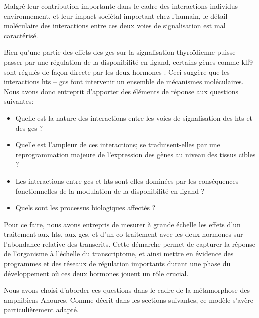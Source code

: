 \documentclass[../main.tex]{subfiles}
\begin{document}
\par
Malgré leur contribution importante dans le cadre des interactions individus-environnement, et leur impact sociétal important chez l'humain, le détail moléculaire des interactions entre ces deux voies de signalisation est mal caractérisé.
\par
Bien qu'une partie des effets des \glspl{gc} sur la signalisation thyroïdienne puisse passer par une régulation de la disponibilité en ligand, certains gènes comme \gls{klf9} sont régulés de façon directe par les deux hormones \citep{Denver2009b,Bagamasbad2012}.
Ceci suggère que les interactions \glspl{ht} – \glspl{gc} font intervenir un ensemble de mécanismes moléculaires. 
Nous avons donc entreprit d'apporter des éléments de réponse aux questions suivantes:
\begin{itemize}
\item Quelle est la nature des interactions entre les voies de signalisation des \glspl{ht} et des \glspl{gc} ? 
\item Quelle est l'ampleur de ces interactions; se traduisent-elles par une reprogrammation majeure de l'expression des gènes au niveau des tissus cibles ?
\item Les interactions entre \glspl{gc} et \glspl{ht} sont-elles dominées par les conséquences fonctionnelles de la modulation de la disponibilité en ligand ?
\item Quels sont les processus biologiques affectés ?
\end{itemize}
\par
Pour ce faire, nous avons entrepris de mesurer à grande échelle les effets d'un traitement aux \glspl{ht}, aux \glspl{gc}, et d'un co-traitement avec les deux hormones sur l'abondance relative des transcrits.
Cette démarche permet de capturer la réponse de l'organisme à l'échelle du transcriptome, et ainsi mettre en évidence des programmes et des réseaux de régulation importants durant une phase du développement où ces deux hormones jouent un rôle crucial.
\par
Nous avons choisi d'aborder ces questions dans le cadre de la métamorphose des amphibiens Anoures.
Comme décrit dans les sections suivantes, ce modèle s'avère particulièrement adapté.



\end{document}

